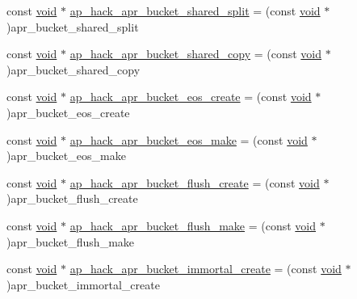 \begin{DoxyCompactItemize}
\item 
const \hyperlink{group__MOD__ISAPI_gacd6cdbf73df3d9eed42fa493d9b621a6}{void} $\ast$ \hyperlink{srclib_2apr-util_2exports_8c_ad0a4e7f482a38a0b3f90014822001ef8}{ap\+\_\+hack\+\_\+apr\+\_\+bucket\+\_\+shared\+\_\+split} = (const \hyperlink{group__MOD__ISAPI_gacd6cdbf73df3d9eed42fa493d9b621a6}{void} $\ast$)apr\+\_\+bucket\+\_\+shared\+\_\+split
\item 
const \hyperlink{group__MOD__ISAPI_gacd6cdbf73df3d9eed42fa493d9b621a6}{void} $\ast$ \hyperlink{srclib_2apr-util_2exports_8c_aefa726f627bec81736877496d4937bcb}{ap\+\_\+hack\+\_\+apr\+\_\+bucket\+\_\+shared\+\_\+copy} = (const \hyperlink{group__MOD__ISAPI_gacd6cdbf73df3d9eed42fa493d9b621a6}{void} $\ast$)apr\+\_\+bucket\+\_\+shared\+\_\+copy
\item 
const \hyperlink{group__MOD__ISAPI_gacd6cdbf73df3d9eed42fa493d9b621a6}{void} $\ast$ \hyperlink{srclib_2apr-util_2exports_8c_ac3e45ce55939ff1bfe0e865b33456f17}{ap\+\_\+hack\+\_\+apr\+\_\+bucket\+\_\+eos\+\_\+create} = (const \hyperlink{group__MOD__ISAPI_gacd6cdbf73df3d9eed42fa493d9b621a6}{void} $\ast$)apr\+\_\+bucket\+\_\+eos\+\_\+create
\item 
const \hyperlink{group__MOD__ISAPI_gacd6cdbf73df3d9eed42fa493d9b621a6}{void} $\ast$ \hyperlink{srclib_2apr-util_2exports_8c_a9e290727fac182301f35baf4d2427282}{ap\+\_\+hack\+\_\+apr\+\_\+bucket\+\_\+eos\+\_\+make} = (const \hyperlink{group__MOD__ISAPI_gacd6cdbf73df3d9eed42fa493d9b621a6}{void} $\ast$)apr\+\_\+bucket\+\_\+eos\+\_\+make
\item 
const \hyperlink{group__MOD__ISAPI_gacd6cdbf73df3d9eed42fa493d9b621a6}{void} $\ast$ \hyperlink{srclib_2apr-util_2exports_8c_a64bb83d97ad79580015d55babae90ae2}{ap\+\_\+hack\+\_\+apr\+\_\+bucket\+\_\+flush\+\_\+create} = (const \hyperlink{group__MOD__ISAPI_gacd6cdbf73df3d9eed42fa493d9b621a6}{void} $\ast$)apr\+\_\+bucket\+\_\+flush\+\_\+create
\item 
const \hyperlink{group__MOD__ISAPI_gacd6cdbf73df3d9eed42fa493d9b621a6}{void} $\ast$ \hyperlink{srclib_2apr-util_2exports_8c_aa87328c4784ed06ae81e9dc695920bb5}{ap\+\_\+hack\+\_\+apr\+\_\+bucket\+\_\+flush\+\_\+make} = (const \hyperlink{group__MOD__ISAPI_gacd6cdbf73df3d9eed42fa493d9b621a6}{void} $\ast$)apr\+\_\+bucket\+\_\+flush\+\_\+make
\item 
const \hyperlink{group__MOD__ISAPI_gacd6cdbf73df3d9eed42fa493d9b621a6}{void} $\ast$ \hyperlink{srclib_2apr-util_2exports_8c_a4191f6aacaa1f6a2dc2c5c908e855a80}{ap\+\_\+hack\+\_\+apr\+\_\+bucket\+\_\+immortal\+\_\+create} = (const \hyperlink{group__MOD__ISAPI_gacd6cdbf73df3d9eed42fa493d9b621a6}{void} $\ast$)apr\+\_\+bucket\+\_\+immortal\+\_\+create

\end{DoxyCompactItemize}
